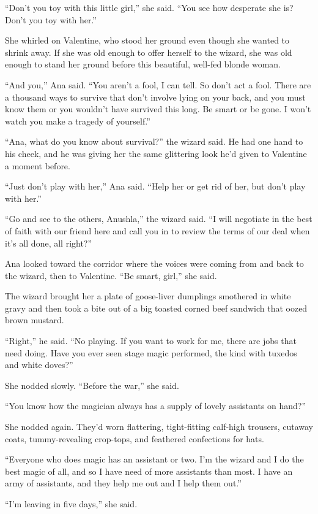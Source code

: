“Don’t you toy with this little girl,” she said. “You see how
desperate she is? Don’t you toy with her.”

She whirled on Valentine, who stood her ground even though she
wanted to shrink away. If she was old enough to offer herself to
the wizard, she was old enough to stand her ground before this
beautiful, well-fed blonde woman.

“And you,” Ana said. “You aren’t a fool, I can tell. So don’t act a
fool. There are a thousand ways to survive that don’t involve lying
on your back, and you must know them or you wouldn’t have survived
this long. Be smart or be gone. I won’t watch you make a tragedy of
yourself.”

“Ana, what do you know about survival?” the wizard said. He had one
hand to his cheek, and he was giving her the same glittering look
he’d given to Valentine a moment before.

“Just don’t play with her,” Ana said. “Help her or get rid of her,
but don’t play with her.”

“Go and see to the others, Anushla,” the wizard said. “I will
negotiate in the best of faith with our friend here and call you in
to review the terms of our deal when it’s all done, all right?”

Ana looked toward the corridor where the voices were coming from
and back to the wizard, then to Valentine. “Be smart, girl,” she
said.

The wizard brought her a plate of goose-liver dumplings smothered
in white gravy and then took a bite out of a big toasted corned
beef sandwich that oozed brown mustard.

“Right,” he said. “No playing. If you want to work for me, there
are jobs that need doing. Have you ever seen stage magic performed,
the kind with tuxedos and white doves?”

She nodded slowly. “Before the war,” she said.

“You know how the magician always has a supply of lovely assistants
on hand?”

She nodded again. They’d worn flattering, tight-fitting calf-high
trousers, cutaway coats, tummy-revealing crop-tops, and feathered
confections for hats.

“Everyone who does magic has an assistant or two. I’m the wizard
and I do the best magic of all, and so I have need of more
assistants than most. I have an army of assistants, and they help
me out and I help them out.”

“I’m leaving in five days,” she said.

